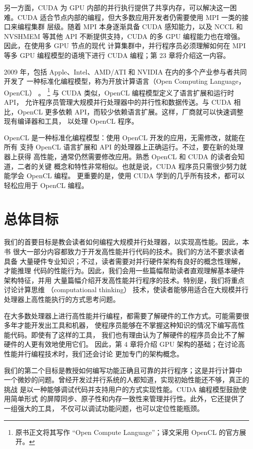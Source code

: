 另一方面，CUDA 为 GPU 内部的并行执行提供了共享内存，可以解决这一困难。CUDA
适合节点内部的编程，但大多数应用开发者仍需要使用 MPI 一类的接口来编程集群
层级。随着 MPI 本身逐渐具备 CUDA 感知能力，以及 NCCL 和 NVSHMEM 等其他 API
不断提供支持，CUDA 的多 GPU 编程能力也在增强。因此，在使用多 GPU 节点的现代
计算集群中，并行程序员必须理解如何在 MPI 等多 GPU 编程模型的语境下进行 CUDA
编程；第 23 章将介绍这一内容。

2009 年，包括 Apple、Intel、AMD/ATI 和 NVIDIA 在内的多个产业参与者共同开发了
一种标准化编程模型，称为开放计算语言（Open Computing Language，OpenCL）
\cite{opencl2008}。
\footnote{原书正文将其写作 ``Open Compute Language''；译文采用 OpenCL
的官方展开。}
与 CUDA 类似，OpenCL 编程模型定义了语言扩展和运行时 API，
允许程序员管理大规模并行处理器中的并行性和数据传送。与 CUDA 相比，OpenCL
更多依赖 API，而较少依赖语言扩展。这样，厂商就可以快速调整现有编译器和工具，
以处理 OpenCL 程序。

OpenCL 是一种标准化编程模型：使用 OpenCL 开发的应用，无需修改，就能在所有
支持 OpenCL 语言扩展和 API 的处理器上正确运行。不过，要在新的处理器上获得
高性能，通常仍然需要修改应用。熟悉 OpenCL 和 CUDA 的读者会知道，二者的关键
概念和特性非常相似。也就是说，CUDA 程序员只需很少努力就能学会 OpenCL 编程。
更重要的是，使用 CUDA 学到的几乎所有技术，都可以轻松应用于 OpenCL 编程。

\section{总体目标}
\label{sec:overarching-goals}

我们的首要目标是教会读者如何编程大规模并行处理器，以实现高性能。因此，本书
很大一部分内容都致力于开发高性能并行代码的技术。我们的方法不要求读者具备
大量硬件专业知识；不过，读者需要对并行硬件架构有良好的概念性理解，才能推理
代码的性能行为。因此，我们会用一些篇幅帮助读者直观理解基本硬件架构特征，并用
大量篇幅介绍开发高性能并行程序的技术。特别是，我们将重点讨论计算思维
（computational thinking）\cite{wing2006} 技术，使读者能够用适合在大规模并行
处理器上高性能执行的方式思考问题。

在大多数处理器上进行高性能并行编程，都需要了解硬件的工作方式。可能需要很多年才能开发出工具和机器，
使程序员能够在不掌握这种知识的情况下编写高性能代码。即使有了这样的工具，
我们也有理由认为了解硬件的程序员会比不了解硬件的人更有效地使用它们。
因此，第 4 章将介绍 GPU 架构的基础；在讨论高性能并行编程技术时，我们还会讨论
更加专门的架构概念。

我们的第二个目标是教授如何编写功能正确且可靠的并行程序；这是并行计算中
一个微妙的问题。曾经开发过并行系统的人都知道，实现初始性能还不够，真正的挑战
是以一种能够调试代码并支持用户的方式实现性能。CUDA 编程模型鼓励使用简单形式
的屏障同步、原子性和内存一致性来管理并行性。此外，它还提供了一组强大的工具，
不仅可以调试功能问题，也可以定位性能瓶颈。


